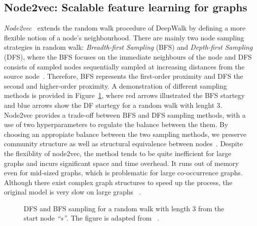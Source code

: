 \subsection{Node2vec: Scalable feature learning for graphs }
\label{subsec:node2vec}
\emph{Node2vec}~ extends the random walk procedure of DeepWalk by defining a more flexible notion of a node’s neighbourhood. There are mainly two node sampling strategies in random walk: \emph{Breadth-first Sampling} (BFS) and \emph{Depth-first Sampling} (DFS), where the BFS focuses on the immediate neighbours of the node and DFS consists of sampled nodes sequentially sampled at increasing distances from the source node~.
Therefore, BFS represents the first-order proximity and DFS the second and higher-order proximity. A demonstration of different sampling methods is provided in Figure~\ref{fig:dfs_bfs}, where red arrows illustrated the BFS startegy and blue arrows show the DF startegy for a random walk with lenght $3$. Node2vec provides a trade-off between BFS and DFS sampling methods, with a use of two hyperparameters to regulate the balance between the them. By choosing an appropiate  balance between the two sampling methods, we preserve community structure as well as structural equivalence between nodes~.
Despite the flexiblity of node2vec, the method tends to be quite inefficient for large graphs and incurs significant space and time overhead. It runs out of memory even for mid-sized graphs, which is problematic for large co-occurrence graphs. Although there exist complex graph structures to speed up the process, the original model is very slow on large graphs ~. 
\begin{figure}
\centering 
\resizebox{0.45\textwidth}{0.25\textwidth}{      

}
\caption{DFS and BFS sampling for a random walk with length $3$ from the start node \emph{``s''}. The figure is adapted from ~.}
\label{fig:dfs_bfs}
\end{figure}
